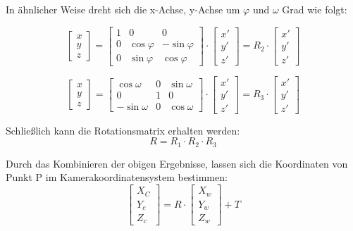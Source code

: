 In ähnlicher Weise dreht sich die x-Achse, y-Achse um $\varphi$ und $\omega$ Grad wie folgt:

\begin{equation}
   \begin{bmatrix}
	x \\  
	y \\
	z
	\end{bmatrix} = \begin{bmatrix}
		1   & 0          & 0	\\
		0   & \cos\varphi & -\sin\varphi	\\
	    0   & \sin\varphi& \cos\varphi	
	\end{bmatrix} \cdot \begin{bmatrix}
	x' \\  
	y' \\
	z'
	\end{bmatrix}= R_2 \cdot \begin{bmatrix}
	x' \\  
	y' \\
	z'
	\end{bmatrix}
\end{equation}

\begin{equation}
   \begin{bmatrix}
	x \\  
	y \\
	z
	\end{bmatrix} = \begin{bmatrix}
	\cos\omega  & 0           & \sin\omega	\\		
	0    	    & 1           & 0	\\
	-\sin\omega &0            &  \cos\omega
	\end{bmatrix} \cdot \begin{bmatrix}
	x' \\  
	y' \\
	z'
	\end{bmatrix}= R_3 \cdot \begin{bmatrix}
	x' \\  
	y' \\
	z'
	\end{bmatrix}
\end{equation}

Schließlich kann die Rotationsmatrix \cite{Rotation} erhalten werden:
\begin{equation}
   R = R_1 \cdot R_2 \cdot R_3
\end{equation}

Durch das Kombinieren der obigen Ergebnisse, lassen sich die Koordinaten von Punkt P im Kamerakoordinatensystem bestimmen:
\begin{equation}
   \begin{bmatrix}
	X_C \\  
	Y_c \\
	Z_c
	\end{bmatrix} = R \cdot \begin{bmatrix}
	X_w \\  
	Y_w \\
	Z_w 
	\end{bmatrix} +T
\end{equation}

